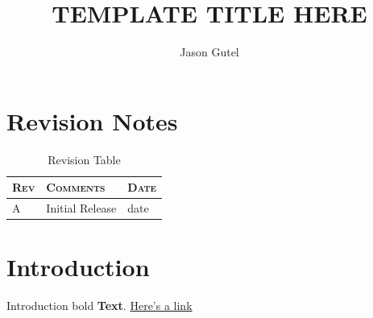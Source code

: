 \documentclass[oneside,english,chapters]{smireport}
\author{Jason Gutel}
\newcommand{\titletext}{TEMPLATE TITLE HERE}
\providecommand{\tabularnewline}{\\}
\begin{document}
\renewcommand\HeaderTitle{\titletext}{}

\renewcommand\DocNumber{9XXXX-Y}{}

\renewcommand\DocRev{A}{}

\renewcommand\SVNRevision{\$Rev\$}{}

\renewcommand\TitleBlockTitleLineOne{\titletext}{}

\renewcommand\TitleBlockTitleLineTwo{TEMPLATE Title Line 2}{}

\title{\titletext}

\maketitle
\tableofcontents{}

\listoffigures

\listoftables
{}

\chapter{Revision Notes}
\begin{table}[H]
  \begin{tabular}{|>{\centering}p{}|>{\centering}p{}|>{\centering}p{}|}
    \hline
    \textbf{\textsc{Rev}} & \textbf{\textsc{Comments}} & \textbf{\textsc{Date}}\tabularnewline
    \hline
    \hline
    A & Initial Release & date\tabularnewline
    \hline
  \end{tabular}
  \caption{Revision Table}\label{tab:revision-table}
\end{table}



\chapter{Introduction}
Introduction bold \textbf{Text}.
\newline
\href{https://github.com/gutelfuldead/dotfiles}{Here's a link}
\end{document}

